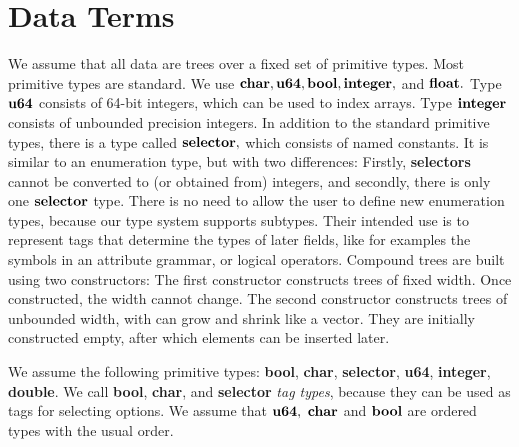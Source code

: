 

\section{Data Terms}
\label{Sect_data_terms}

We assume that all data are trees over a fixed set of primitive
types. Most primitive types are standard.
We use 
$ {\bf char}, {\bf u64}, {\bf bool}, {\bf integer}, $ and
$ {\bf float}. $ Type $ {\bf u64} $ consists of 64-bit integers,
which can be used to index arrays. Type $ {\bf integer} $ 
consists of unbounded precision integers.  
In addition to the standard primitive types, there is a type
called $ {\bf selector}, $ which consists of named constants.
It is similar to an enumeration type, but with two differences:
Firstly, {\bf selectors} cannot be converted to (or obtained from) integers,
and secondly, there is only one $ {\bf selector} $
type. There is no need to allow
the user to define new enumeration types, because our type
system supports subtypes. Their intended use is to represent
tags that determine the types of later fields, 
like for examples the symbols in an attribute
grammar, or logical operators.
Compound trees are built using two constructors: The first
constructor constructs trees of fixed width. Once constructed,
the width cannot change.
The second constructor constructs trees of unbounded width,
with can grow and shrink like a vector. They are initially
constructed empty, after which elements can be inserted later.
\begin{definition}
   \label{Def_primtype} 
   We assume the following primitive types:
      {\bf bool}, {\bf char}, {\bf selector},
      {\bf u64}, {\bf integer}, {\bf double}.
   We call {\bf bool}, {\bf char}, and {\bf selector}
   \emph{tag types}, because they can be used as tags
   for selecting options.
   We assume that $ {\bf u64}, \ {\bf char} $ and $ {\bf bool} $
   are ordered types with the usual order.
\end{definition}

